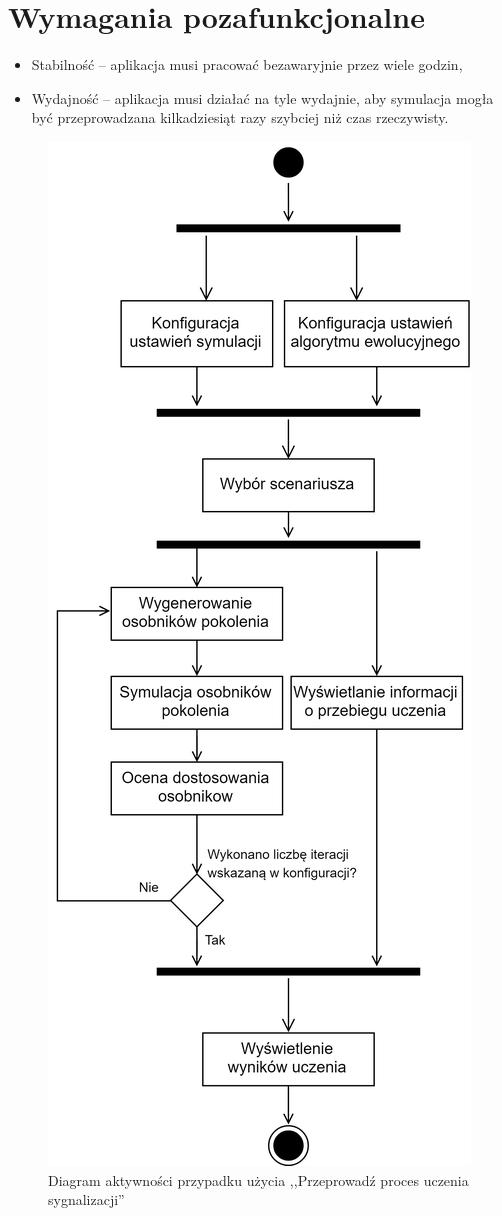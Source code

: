 \section*{Wymagania pozafunkcjonalne}
\begin{itemize}
	\item Stabilność -- aplikacja musi pracować bezawaryjnie przez wiele godzin,
	\item Wydajność -- aplikacja musi działać na tyle wydajnie, aby symulacja mogła być przeprowadzana kilkadziesiąt razy szybciej niż czas rzeczywisty.
\end{itemize}
\begin{figure}
	\centering
	\includegraphics[height=0.9\textheight]{diagram_aktywnosci}
	\caption[Diagram aktywności przypadku użycia ,,Przeprowadź proces uczenia sygnalizacji'']{Diagram aktywności przypadku użycia ,,Przeprowadź proces uczenia sygnalizacji''}
	\label{fig:diagramaktywnosci}
\end{figure}
